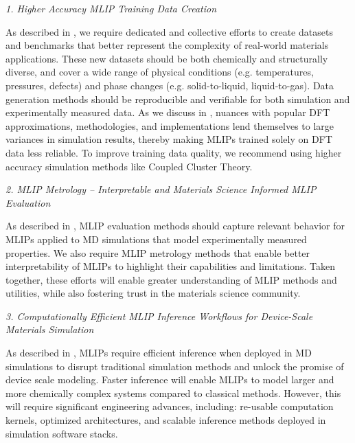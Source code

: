 \emph{1. Higher Accuracy MLIP Training Data Creation} 

As described in , we require dedicated and collective efforts to create datasets and benchmarks that better represent the complexity of real-world materials applications. These new datasets should be both chemically and structurally diverse, and cover a wide range of physical conditions (e.g. temperatures, pressures, defects) and phase changes (e.g. solid-to-liquid, liquid-to-gas). 
Data generation methods should be reproducible and verifiable for both simulation and experimentally measured data. As we discuss in , nuances with popular DFT approximations, methodologies, and implementations lend themselves to large variances in simulation results, thereby making MLIPs trained solely on DFT data less reliable. To improve training data quality, we recommend using higher accuracy simulation methods like Coupled Cluster Theory.

\emph{2. MLIP Metrology -- Interpretable and Materials Science Informed MLIP Evaluation}

As described in , MLIP evaluation methods should capture relevant behavior for MLIPs applied to MD simulations that model experimentally measured properties. We also require MLIP metrology methods that enable better interpretability of MLIPs to highlight their capabilities and limitations. Taken together, these efforts will enable greater understanding of MLIP methods and utilities, while also fostering trust in the materials science community.

\emph{3. Computationally Efficient MLIP Inference Workflows for Device-Scale Materials Simulation}

As described in , MLIPs require efficient inference when deployed in MD simulations to disrupt traditional simulation methods and unlock the promise of device scale modeling. Faster inference will enable MLIPs to model larger and more chemically complex systems compared to classical methods. However, this will require significant engineering advances, including: re-usable computation kernels, optimized architectures, and scalable inference methods deployed in simulation software stacks.
